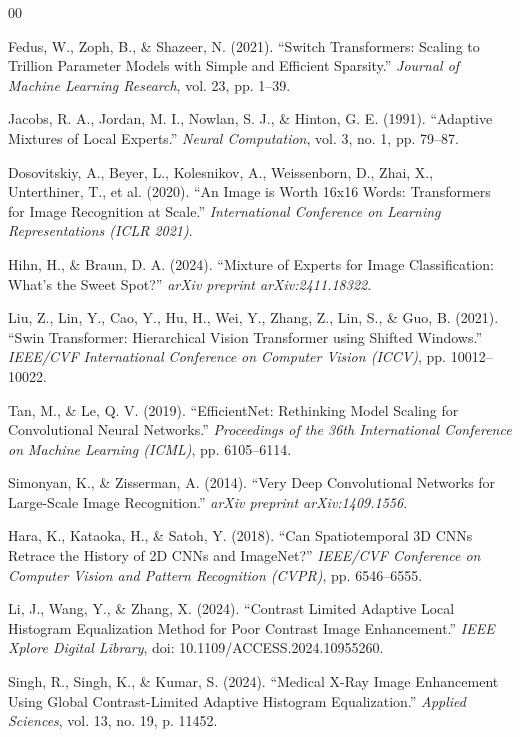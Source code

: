 \documentclass[conference, 11pt]{IEEEtran}
\begin{document}
\begin{thebibliography}{00}

 Fedus, W., Zoph, B., \& Shazeer, N. (2021). ``Switch Transformers: Scaling to Trillion Parameter Models with Simple and Efficient Sparsity.'' \textit{Journal of Machine Learning Research}, vol. 23, pp. 1--39.

 Jacobs, R. A., Jordan, M. I., Nowlan, S. J., \& Hinton, G. E. (1991). ``Adaptive Mixtures of Local Experts.'' \textit{Neural Computation}, vol. 3, no. 1, pp. 79--87.

 Dosovitskiy, A., Beyer, L., Kolesnikov, A., Weissenborn, D., Zhai, X., Unterthiner, T., et al. (2020). ``An Image is Worth 16x16 Words: Transformers for Image Recognition at Scale.'' \textit{International Conference on Learning Representations (ICLR 2021)}.

 Hihn, H., \& Braun, D. A. (2024). ``Mixture of Experts for Image Classification: What's the Sweet Spot?'' \textit{arXiv preprint arXiv:2411.18322}.

 Liu, Z., Lin, Y., Cao, Y., Hu, H., Wei, Y., Zhang, Z., Lin, S., \& Guo, B. (2021). ``Swin Transformer: Hierarchical Vision Transformer using Shifted Windows.'' \textit{IEEE/CVF International Conference on Computer Vision (ICCV)}, pp. 10012--10022.

 Tan, M., \& Le, Q. V. (2019). ``EfficientNet: Rethinking Model Scaling for Convolutional Neural Networks.'' \textit{Proceedings of the 36th International Conference on Machine Learning (ICML)}, pp. 6105--6114.

 Simonyan, K., \& Zisserman, A. (2014). ``Very Deep Convolutional Networks for Large-Scale Image Recognition.'' \textit{arXiv preprint arXiv:1409.1556}.

 Hara, K., Kataoka, H., \& Satoh, Y. (2018). ``Can Spatiotemporal 3D CNNs Retrace the History of 2D CNNs and ImageNet?'' \textit{IEEE/CVF Conference on Computer Vision and Pattern Recognition (CVPR)}, pp. 6546--6555.

 Li, J., Wang, Y., \& Zhang, X. (2024). ``Contrast Limited Adaptive Local Histogram Equalization Method for Poor Contrast Image Enhancement.'' \textit{IEEE Xplore Digital Library}, doi: 10.1109/ACCESS.2024.10955260.

 Singh, R., Singh, K., \& Kumar, S. (2024). ``Medical X-Ray Image Enhancement Using Global Contrast-Limited Adaptive Histogram Equalization.'' \textit{Applied Sciences}, vol. 13, no. 19, p. 11452.


\end{thebibliography}
\end{document}
